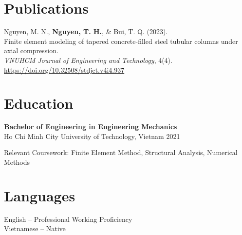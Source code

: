 \documentclass[a4paper,10pt]{article}
\begin{document}
\section*{Publications}

Nguyen, M. N., \textbf{Nguyen, T. H.}, \& Bui, T. Q. (2023). \\
Finite element modeling of tapered concrete-filled steel tubular columns under axial compression. \\
\emph{VNUHCM Journal of Engineering and Technology}, 4(4). \\
\href{https://doi.org/10.32508/stdjet.v4i4.937}{https://doi.org/10.32508/stdjet.v4i4.937}

\section*{Education}

\textbf{Bachelor of Engineering in Engineering Mechanics} \\
Ho Chi Minh City University of Technology, Vietnam \hfill 2021

Relevant Coursework: Finite Element Method, Structural Analysis, Numerical Methods

\section*{Languages}

English -- Professional Working Proficiency \\
Vietnamese -- Native
\end{document}
